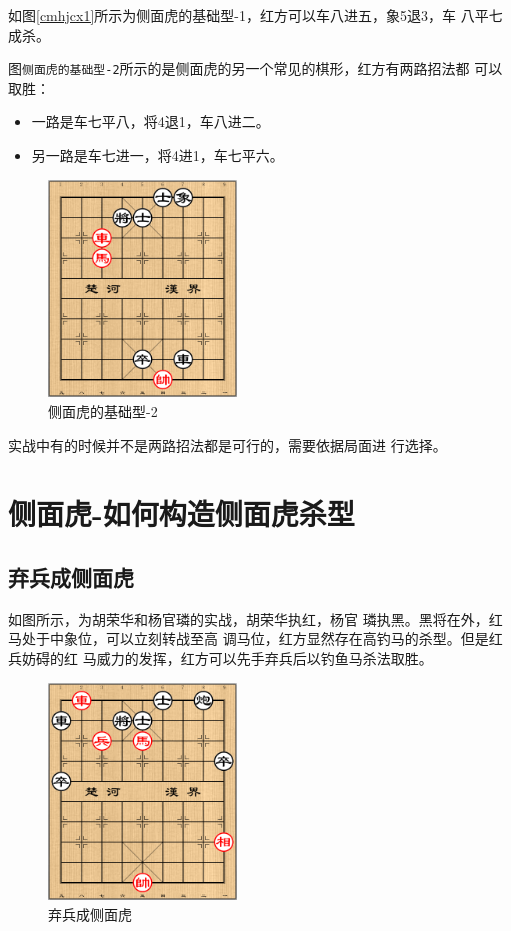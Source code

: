 \documentclass[a5paper,twoside]{book}
\begin{document}
如图\ref{cmhjcx1}所示为侧面虎的基础型-1，红方可以车八进五，象5退3，车
八平七成杀。

图\texttt{侧面虎的基础型-2}所示的是侧面虎的另一个常见的棋形，红方有两路招法都
可以取胜：
\begin{itemize}
\item 一路是车七平八，将4退1，车八进二。
\item 另一路是车七进一，将4进1，车七平六。
\end{itemize}


\begin{figure}[H]
\centering
\includegraphics[width=5cm]{pic/侧面虎的基础型-2.png}
\caption{侧面虎的基础型-2}
\end{figure}


实战中有的时候并不是两路招法都是可行的，需要依据局面进
行选择。

\section{侧面虎-如何构造侧面虎杀型}
\label{sec-4-2}
\subsection{弃兵成侧面虎}
\label{sec-4-2-1}
如图所示，为胡荣华和杨官璘的实战，胡荣华执红，杨官
璘执黑。黑将在外，红马处于中象位，可以立刻转战至高
调马位，红方显然存在高钓马的杀型。但是红兵妨碍的红
马威力的发挥，红方可以先手弃兵后以钓鱼马杀法取胜。

\begin{figure}[H]
\centering
\includegraphics[width=5cm]{pic/弃兵成侧面虎.png}
\caption{弃兵成侧面虎}
\end{figure}
\end{document}
